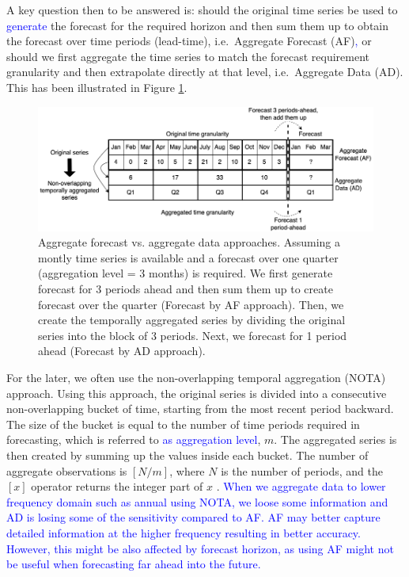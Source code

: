 \documentclass[preprint, 3p,
authoryear]{elsarticle} %
\begin{document}
A key question then to be answered is: should the original time series
be used to \textcolor{blue}{generate} the forecast for the required
horizon and then sum them up to obtain the forecast over time periods
(lead-time), i.e.~Aggregate Forecast (AF)\textcolor{blue}{,} or should
we first aggregate the time series to match the forecast requirement
granularity and then extrapolate directly at that level, i.e.~Aggregate
Data (AD). This has been illustrated in Figure \ref{fig:example_oanoa}.

\begin{figure}[H]
\includegraphics[width=0.9\linewidth]{img/300dpi/nota} \caption{Aggregate forecast vs. aggregate data approaches. Assuming a montly time series is available and a forecast over one quarter (aggregation level = 3 months) is required. We first generate forecast for 3 periods ahead and then sum them up to create forecast over the quarter (Forecast by AF approach). Then, we create the temporally aggregated series by dividing the original series into the block of 3 periods. Next, we forecast for 1 period ahead (Forecast by AD approach).}\label{fig:example_oanoa}
\end{figure}

For the later, we often use the non-overlapping temporal aggregation
(NOTA) approach. Using this approach, the original series is divided
into a consecutive non-overlapping bucket of time, starting from the
most recent period backward. The size of the bucket is equal to the
number of time periods required in forecasting, which is referred to
\textcolor{blue}{as aggregation level}, \(m\). The aggregated series is
then created by summing up the values inside each bucket. The number of
aggregate observations is \([N/m]\), where \(N\) is the number of
periods, and the \([x]\) operator returns the integer part of \(x\)
\citep{rostami2019impact}.
\textcolor{blue}{When we aggregate data to lower frequency domain such as annual using NOTA, we loose some information and AD is losing some of the sensitivity compared to AF. AF may better capture detailed information at the higher frequency resulting in better accuracy. However, this might be also affected by forecast horizon, as using AF might not be useful when forecasting far ahead into the future.}
\end{document}
